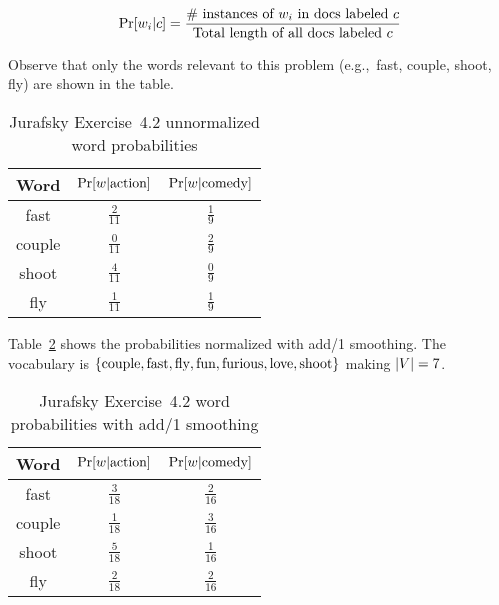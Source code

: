 \begin{equation}\label{eq:P02:MultinomialWordProb}
  \Pr\lbrack w_i \vert c\rbrack = \frac{\text{\# instances of } w_i \text{ in docs labeled } c}{\text{Total length of all docs labeled } c}
\end{equation}

\noindent
Observe that only the words relevant to this problem (e.g.,~fast, couple, shoot, fly) are shown in the table.

\begin{table}[h]
  \centering
  \caption{Jurafsky Exercise~4.2 unnormalized word probabilities}\label{tab:P02:UnnormalWordProb}
  \begin{tabular}{|c||c|c|}
    \hline
    \textbf{Word}  & $\Pr\lbrack w \vert \text{action}\rbrack$ & $\Pr\lbrack w \vert \text{comedy}\rbrack$ \\\hline\hline
    fast           &  $\frac{2}{11}$  &  $\frac{1}{9}$ \\\hline
    couple         &  $\frac{0}{11}$  &  $\frac{2}{9}$ \\\hline
    shoot          &  $\frac{4}{11}$  &  $\frac{0}{9}$ \\\hline
    fly            &  $\frac{1}{11}$  &  $\frac{1}{9}$ \\\hline
  \end{tabular}
\end{table}

Table~\ref{tab:P02:NormalWordProb} shows the probabilities normalized with add\-/1 smoothing.  The vocabulary is $\{\text{couple}, \text{fast}, \text{fly}, \linebreak\text{fun}, \text{furious}, \text{love}, \text{shoot}\}$ making ${\lvert V\rvert = 7}$.

\begin{table}[h]
  \centering
  \caption{Jurafsky Exercise~4.2 word probabilities with add\-/1 smoothing}\label{tab:P02:NormalWordProb}
  \begin{tabular}{|c||c|c|}
    \hline
    \textbf{Word}  & $\Pr\lbrack w \vert \text{action}\rbrack$ & $\Pr\lbrack w \vert \text{comedy}\rbrack$ \\\hline\hline
    fast           &  $\frac{3}{18}$  &  $\frac{2}{16}$ \\\hline
    couple         &  $\frac{1}{18}$  &  $\frac{3}{16}$ \\\hline
    shoot          &  $\frac{5}{18}$  &  $\frac{1}{16}$ \\\hline
    fly            &  $\frac{2}{18}$  &  $\frac{2}{16}$ \\\hline
  \end{tabular}
\end{table}


